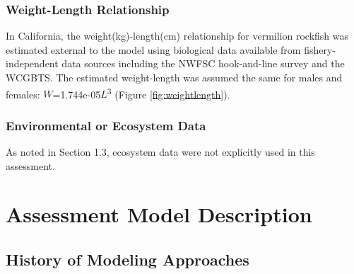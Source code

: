\documentclass[11pt,
  english,
]{article}
\begin{document}

\hypertarget{weight-length-relationship}{%
\subsubsection{Weight-Length Relationship}\label{weight-length-relationship}}

\leavevmode\tagmcend\tagstructend

In California, the weight(kg)-length(cm) relationship for vermilion rockfish was estimated external to the model using biological data available from fishery-independent data sources including the NWFSC hook-and-line survey and the WCGBTS. The estimated weight-length was assumed the same for males and females: {\(W\)\leavevmode\tagmcend\tagstructend}=1.744e-05{\(L\)\leavevmode\tagmcend\tagstructend}\textsuperscript{3} (Figure \ref{fig:weightlength}).


\hypertarget{environmental-or-ecosystem-data}{%
\subsubsection{Environmental or Ecosystem Data}\label{environmental-or-ecosystem-data}}

\leavevmode\tagmcend\tagstructend

As noted in Section 1.3, ecosystem data were not explicitly used in this assessment.


\hypertarget{assessment-model-description}{%
\section{Assessment Model Description}\label{assessment-model-description}}

\leavevmode\tagmcend\tagstructend


\hypertarget{history-of-modeling-approaches}{%
\subsection{History of Modeling Approaches}\label{history-of-modeling-approaches}}

\leavevmode\tagmcend\tagstructend
\end{document}
